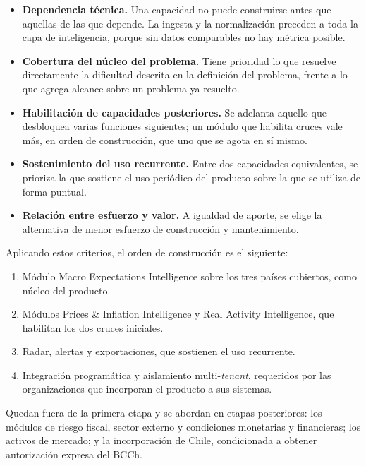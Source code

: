 \documentclass[11pt,a4paper]{article}
\newcommand{\modMacro}{Macro Expectations Intelligence}
\newcommand{\modPrecios}{Prices \& Inflation Intelligence}
\newcommand{\modActividad}{Real Activity Intelligence}
\begin{document}
\begin{itemize}
  \item \textbf{Dependencia t\'ecnica.} Una capacidad no puede construirse antes
        que aquellas de las que depende. La ingesta y la normalizaci\'on
        preceden a toda la capa de inteligencia, porque sin datos comparables no
        hay m\'etrica posible.
  \item \textbf{Cobertura del n\'ucleo del problema.} Tiene prioridad lo que
        resuelve directamente la dificultad descrita en la definici\'on del
        problema, frente a lo que agrega alcance sobre un problema ya resuelto.
  \item \textbf{Habilitaci\'on de capacidades posteriores.} Se adelanta aquello
        que desbloquea varias funciones siguientes; un m\'odulo que habilita
        cruces vale m\'as, en orden de construcci\'on, que uno que se agota en
        s\'i mismo.
  \item \textbf{Sostenimiento del uso recurrente.} Entre dos capacidades
        equivalentes, se prioriza la que sostiene el uso peri\'odico del
        producto sobre la que se utiliza de forma puntual.
  \item \textbf{Relaci\'on entre esfuerzo y valor.} A igualdad de aporte, se
        elige la alternativa de menor esfuerzo de construcci\'on y
        mantenimiento.
\end{itemize}

Aplicando estos criterios, el orden de construcci\'on es el siguiente:

\begin{enumerate}
  \item M\'odulo \modMacro{} sobre los tres pa\'ises cubiertos, como n\'ucleo
        del producto.
  \item M\'odulos \modPrecios{} y \modActividad{}, que habilitan los dos cruces
        iniciales.
  \item Radar, alertas y exportaciones, que sostienen el uso recurrente.
  \item Integraci\'on program\'atica y aislamiento multi-\emph{tenant},
        requeridos por las organizaciones que incorporan el producto a sus
        sistemas.
\end{enumerate}

Quedan fuera de la primera etapa y se abordan en etapas posteriores: los
m\'odulos de riesgo fiscal, sector externo y condiciones monetarias y
financieras; los activos de mercado; y la incorporaci\'on de Chile,
condicionada a obtener autorizaci\'on expresa del BCCh.
\end{document}
